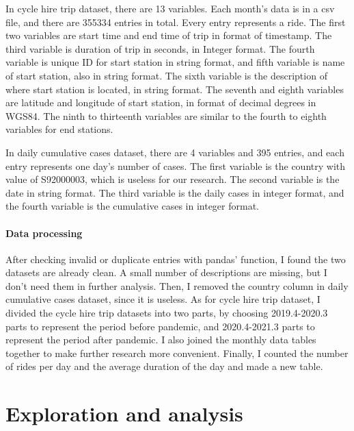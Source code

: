\documentclass[11pt,a4paper]{article}
\begin{document}
In cycle hire trip dataset, there are 13 variables. Each month’s data is in a csv file, and there are 355334 entries in total. Every entry represents a ride. The first two variables are start time and end time of trip in format of timestamp. The third variable is duration of trip in seconds, in Integer format. The fourth variable is unique ID for start station in string format, and fifth variable is name of start station, also in string format. The sixth variable is the description of where start station is located, in string format. The seventh and eighth variables are latitude and longitude of start station, in format of decimal degrees in WGS84. The ninth to thirteenth variables are similar to the fourth to eighth variables for end stations. 

In daily cumulative cases dataset, there are 4 variables and 395 entries, and each entry represents one day’s number of cases. The first variable is the country with value of S92000003, which is useless for our research. The second variable is the date in string format. The third variable is the daily cases in integer format, and the fourth variable is the cumulative cases in integer format. 


\paragraph{Data processing}%

After checking invalid or duplicate entries with pandas’ function, I found the two datasets are already clean. A small number of descriptions are missing, but I don’t need them in further analysis. Then, I removed the country column in daily cumulative cases dataset, since it is useless. As for cycle hire trip dataset, I divided the cycle hire trip datasets into two parts, by choosing 2019.4-2020.3 parts to represent the period before pandemic, and 2020.4-2021.3 parts to represent the period after pandemic. I also joined the monthly data tables together to make further research more convenient. Finally, I counted the number of rides per day and the average duration of the day and made a new table.

\section{Exploration and  analysis}
\end{document}
